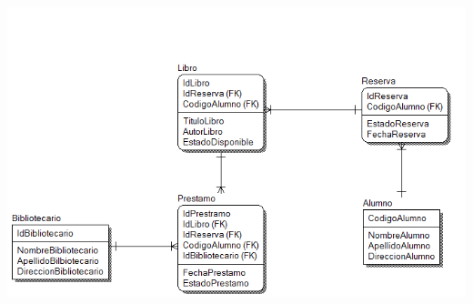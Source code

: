 \begin{enumerate}[1.]
	\begin{center}
	\includegraphics[width=20cm]{./Imagenes/img8} 
	\end{center}
	
	
\end{enumerate} 
